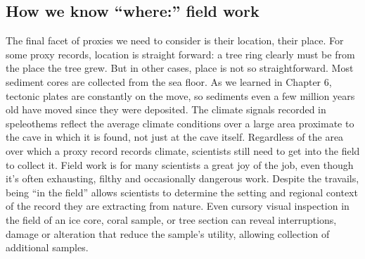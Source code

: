 \documentclass[amstex,12pt]{book}
\begin{document}
\subsection{How we know ``where:'' field work}
The final facet of proxies we need to consider is their location, their place. For some proxy records, location is straight forward: a tree ring clearly must be from the place the tree grew. But in other cases, place is not so straightforward. Most sediment cores are collected from the sea floor. As we learned in Chapter 6, tectonic plates are constantly on the move, so sediments even a few million years old have moved since they were deposited. The climate signals recorded in speleothems reflect the average climate conditions over a large area proximate to the cave in which it is found, not just at the cave itself. Regardless of the area over which a proxy record records climate, scientists still need to get into the field to collect it. Field work is for many scientists a great joy of the job, even though it's often exhausting, filthy and occasionally dangerous work. Despite the travails, being ``in the field'' allows scientists to determine the setting and regional context of the record they are extracting from nature. Even cursory visual inspection in the field of an ice core, coral sample, or tree section can reveal interruptions, damage or alteration that reduce the sample's utility, allowing collection of additional samples.\\ 
\end{document}
